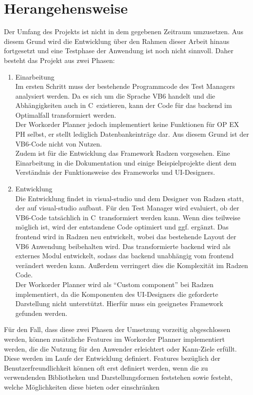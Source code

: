 \section{Herangehensweise}
Der Umfang des Projekts ist nicht in dem gegebenen Zeitraum umzusetzen. Aus diesem Grund wird die Entwicklung über den Rahmen dieser Arbeit hinaus fortgesetzt und eine Testphase der Anwendung ist noch nicht sinnvoll. Daher besteht das Projekt aus zwei Phasen:
\begin{enumerate}
\item Einarbeitung\\
Im ersten Schritt muss der bestehende Programmcode des Test Managers analysiert werden. Da es sich um die Sprache \gls{VB}6 handelt und die Abhängigkeiten auch in C\myHashtag\ existieren, kann der Code für das \gls{backend} im Optimalfall transformiert werden.\\
Der Workorder Planner jedoch implementiert keine Funktionen für \gls{OP EX PH} selbst, er stellt lediglich Datenbankeinträge dar. Aus diesem Grund ist der \gls{VB}6-Code nicht von Nutzen.\\
Zudem ist für die Entwicklung das Framework Radzen vorgesehen. Eine Einarbeitung in die Dokumentation und einige Beispielprojekte dient dem Verständnis der Funktionsweise des Frameworks und \gls{UI}-Designers.
\item Entwicklung\\
Die Entwicklung findet in \gls{visual-studio} und dem Designer von Radzen statt, der auf \gls{visual-studio} aufbaut. Für den Test Manager wird evaluiert, ob der \gls{VB}6-Code tatsächlich in C\myHashtag\ transformiert werden kann. Wenn dies teilweise möglich ist, wird der entstandene Code optimiert und ggf. ergänzt. Das \gls{frontend} wird in Radzen neu entwickelt, wobei das bestehende Layout der \gls{VB}6 Anwendung beibehalten wird. Das transformierte \gls{backend} wird als externes Modul entwickelt, sodass das \gls{backend} unabhängig vom \gls{frontend} verändert werden kann. Außerdem verringert dies die Komplexität im Radzen Code.\\
Der Workorder Planner wird als \enquote{Custom component} bei Radzen implementiert, da die Komponenten des \gls{UI}-Designers die geforderte Darstellung nicht unterstützt. Hierfür muss ein geeignetes Framework gefunden werden.
\end{enumerate}
Für den Fall, dass diese zwei Phasen der Umsetzung vorzeitig abgeschlossen werden, können zusätzliche Features im Workorder Planner implementiert werden, die die Nutzung für den Anwender erleichtert oder Kann-Ziele erfüllt. Diese werden im Laufe der Entwicklung definiert. Features bezüglich der Benutzerfreundlichkeit können oft erst definiert werden, wenn die zu verwendenden Bibliotheken und Darstellungsformen feststehen sowie festeht, welche Möglichkeiten diese bieten oder einschränken